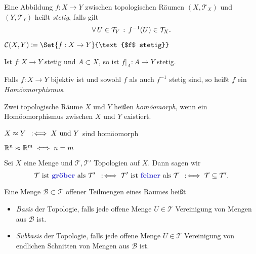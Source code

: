 \documentclass{cheat-sheet}
\newcommand{\Tau}{\mathcal{T}} %
\newcommand{\Cont}{\mathcal{C}} %
\begin{document}
\begin{defn}
  Eine Abbildung $f : X \to Y$ zwischen topologischen Räumen $(X, \Tau_X)$ und $(Y, \Tau_Y)$ heißt \emph{stetig}, falls gilt
  \[ \fa{U \in \Tau_Y} f^{-1}(U) \in \Tau_X. \]
\end{defn}

\begin{nota}
  $\Cont(X, Y) \coloneqq \Set{ f : X \to Y }{\text{$f$ stetig}}$
\end{nota}

\begin{bem}
  Ist $f : X \to Y$ stetig und $A \!\subset\! X$, so ist $f|_A : A \to Y$ stetig.
\end{bem}

\begin{defn}
  Falls $f : X \to Y$ bijektiv ist und sowohl $f$ als auch $f^{-1}$ stetig sind, so heißt $f$ ein \emph{Homöomorphismus}.
\end{defn}

\begin{defn}
  Zwei topologische Räume $X$ und $Y$ heißen \emph{homöomorph}, wenn ein Homöomorphismus zwischen $X$ und $Y$ existiert.
\end{defn}

\begin{nota}
  $X \approx Y \enspace:\!\iff X \text{ und } Y$ sind homöomorph
\end{nota}

\begin{satz}
  $\mathbb{R}^n \approx \mathbb{R}^m \iff n = m$
\end{satz}

\begin{defn}
  Sei $X$ eine Menge und $\Tau, \Tau'$ Topologien auf $X$. Dann sagen wir
  \[ \Tau \text{ ist \emph{gröber} als } \Tau' \coloniff \Tau' \text{ ist \emph{feiner} als } \Tau \coloniff \Tau \subseteq \Tau'. \]
\end{defn}


\begin{defn}
  Eine Menge $\mathcal{B} \subset \Tau$ offener Teilmengen eines Raumes heißt
  \begin{itemize}
    \item \emph{Basis} der Topologie, falls jede offene Menge $U \in \Tau$ Vereinigung von Mengen aus $\mathcal{B}$ ist.
    \item \emph{Subbasis} der Topologie, falls jede offene Menge $U \in \Tau$ Vereinigung
    von endlichen Schnitten von Mengen aus $\mathcal{B}$ ist.
  \end{itemize}
\end{defn}
\end{document}
